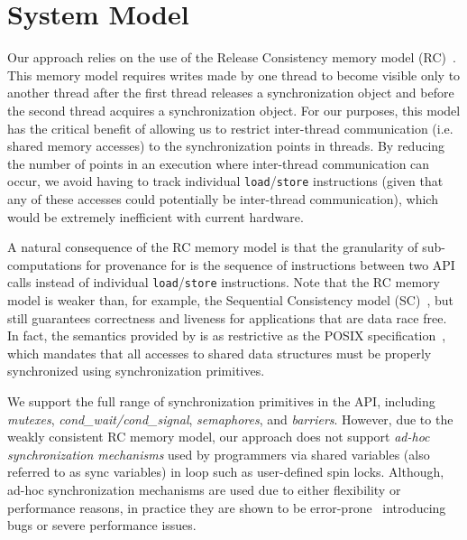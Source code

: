 \section{System Model}
\label{sec:model}

 Our approach relies on the use of the
Release Consistency memory model (RC)~\cite{DSM-RC}. This memory model 
requires writes made by one thread to become visible only to another thread after the
first thread releases a synchronization object and before the second thread
acquires a synchronization object. For our purposes, this model has the critical
benefit of allowing us to restrict inter-thread communication (i.e. shared
memory accesses) to the synchronization points in threads. By reducing the number of 
points in an execution where inter-thread communication can occur, we avoid
having to track individual {\tt load}/{\tt store} instructions (given that any of these
accesses could potentially be inter-thread communication), which would 
be extremely inefficient with current hardware. 

A natural consequence of the RC memory model is that the granularity of sub-computations for provenance for \projecttitle is the sequence of instructions between two \pthreads API calls instead of  individual {\tt load}/{\tt store} instructions. Note that the RC memory model is weaker
than, for example, the Sequential Consistency model (SC)~\cite{scLamport}, but
still guarantees correctness and liveness for applications that are data race
free. In fact,  the semantics provided by
\projecttitle is as restrictive as the POSIX specification~\cite{pthreads-spec}, which mandates that all accesses to shared data structures must be properly synchronized using 
\pthreads synchronization primitives. 

 We support the full range of synchronization
primitives in the \pthreads API, including {\em mutexes}, {\em cond\_wait/cond\_signal}, {\em semaphores},  and {\em
barriers}. However, due to the weakly consistent RC memory model, our approach
does not support {\em ad-hoc synchronization mechanisms} used by programmers via
shared variables (also referred to as sync variables) in loop such as user-defined spin locks. 
Although, ad-hoc synchronization mechanisms are used due to either flexibility
or performance reasons, in practice they are shown to be
error-prone~\cite{adhoc-sync} introducing bugs or severe performance issues.